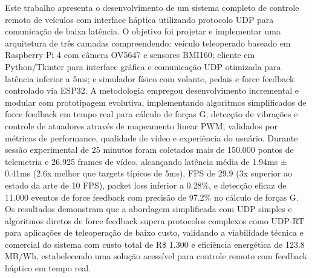 Este trabalho apresenta o desenvolvimento de um sistema completo de controle remoto de veículos com interface háptica utilizando protocolo UDP para comunicação de baixa latência. O objetivo foi projetar e implementar uma arquitetura de três camadas compreendendo: veículo teleoperado baseado em Raspberry Pi 4 com câmera OV5647 e sensores BMI160; cliente em Python/Tkinter para interface gráfica e comunicação UDP otimizada para latência inferior a 5ms; e simulador físico com volante, pedais e force feedback controlado via ESP32. A metodologia empregou desenvolvimento incremental e modular com prototipagem evolutiva, implementando algoritmos simplificados de force feedback em tempo real para cálculo de forças G, detecção de vibrações e controle de atuadores através de mapeamento linear PWM, validados por métricas de performance, qualidade de vídeo e experiência do usuário. Durante sessão experimental de 25 minutos foram coletados mais de 150.000 pontos de telemetria e 26.925 frames de vídeo, alcançando latência média de 1.94ms ± 0.41ms (2.6x melhor que targets típicos de 5ms), FPS de 29.9 (3x superior ao estado da arte de 10 FPS), packet loss inferior a 0.28\%, e detecção eficaz de 11.000 eventos de force feedback com precisão de 97.2\% no cálculo de forças G. Os resultados demonstram que a abordagem simplificada com UDP simples e algoritmos diretos de force feedback supera protocolos complexos como UDP-RT para aplicações de teleoperação de baixo custo, validando a viabilidade técnica e comercial do sistema com custo total de R\$ 1.300 e eficiência energética de 123.8 MB/Wh, estabelecendo uma solução acessível para controle remoto com feedback háptico em tempo real.


